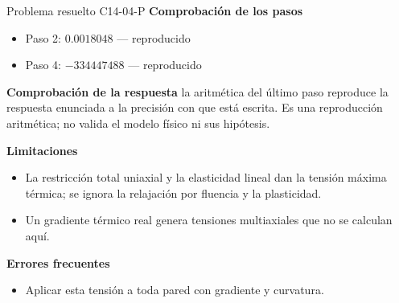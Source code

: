 \documentclass[10pt,openany]{book}
\begin{document}
\begin{studiumworked}{Problema resuelto C14-04-P}
\noindent\textbf{Comprobación de los pasos}
\begin{itemize}
\item Paso 2: $0.0018048$ — reproducido
\item Paso 4: $-334447488$ — reproducido
\end{itemize}

\noindent\textbf{Comprobación de la respuesta} la aritmética del último paso reproduce la respuesta enunciada a la precisión con que está escrita. Es una reproducción aritmética; no valida el modelo físico ni sus hipótesis.

\noindent\textbf{Limitaciones}
\begin{itemize}
\item La restricción total uniaxial y la elasticidad lineal dan la tensión máxima térmica; se ignora la relajación por fluencia y la plasticidad.
\item Un gradiente térmico real genera tensiones multiaxiales que no se calculan aquí.
\end{itemize}

\noindent\textbf{Errores frecuentes}
\begin{itemize}
\item Aplicar esta tensión a toda pared con gradiente y curvatura.
\end{itemize}
\end{studiumworked}
\end{document}
